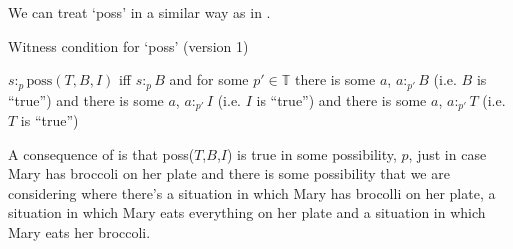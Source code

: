We can treat `poss' in a similar way as in \nexteg{}.
\begin{ex}
  Witness condition for `poss' (version 1)

  $s:_p\text{poss}(T,B,I)$ iff $s:_pB$ and for some $p'\in\mathbb{T}$
  there is some $a$, $a:_{p'}B$ (i.e. $B$ is ``true'') and there is some $a$,
  $a:_{p'}I$ (i.e. $I$ is ``true'') and there is some $a$, $a:_{p'}T$
  (i.e. $T$ is ``true'')
 
 
  
 
\label{ex:possTBI1}
   
\end{ex} 
  
A consequence of \preveg{} is that
poss($T$,$B$,$I$) is true in some possibility, $p$,  just in case Mary
has broccoli on her plate and there is some possibility
that we are considering where there's a situation in which Mary has
brocolli on her plate, a situation in which Mary
eats everything on her plate and a situation in which Mary eats her
broccoli.

